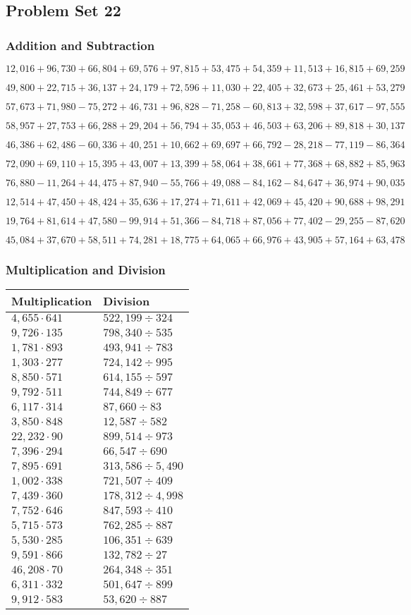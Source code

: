 \hypertarget{problem-set-22-4}{%
\subsection{Problem Set 22}\label{problem-set-22-4}}

\hypertarget{addition-and-subtraction-244}{%
\subsubsection{Addition and
Subtraction}\label{addition-and-subtraction-244}}

\(12,016+96,730+66,804+69,576+97,815+53,475+54,359+11,513+16,815+ 69,259\)

\(49,800+22,715+36,137+24,179+72,596+11,030+22,405+32,673+25,461+53,279\)

\(57,673+71,980-75,272+46,731+96,828-71,258-60,813+32,598+37,617-97,555\)

\(58,957+27,753+66,288+29,204+56,794+35,053+46,503+63,206+89,818+30,137\)

\(46,386+62,486-60,336+40,251+10,662+69,697+66,792-28,218-77,119-86,364\)

\(72,090+69,110+15,395+43,007+13,399+58,064+38,661+77,368+68,882+85,963\)

\(76,880-11,264+44,475+87,940-55,766+49,088-84,162-84,647+36,974+90,035\)

\(12,514+47,450+48,424+35,636+17,274+71,611+42,069+45,420+90,688+98,291\)

\(19,764+81,614+47,580-99,914+51,366-84,718+87,056+77,402-29,255-87,620\)

\(45,084+37,670+58,511+74,281+18,775+64,065+66,976+43,905+57,164+63,478\)

\hypertarget{multiplication-and-division-243}{%
\subsubsection{Multiplication and
Division}\label{multiplication-and-division-243}}

\begin{longtable}[]{@{}ll@{}}
\toprule
Multiplication & Division\tabularnewline
\midrule
\endhead
\(4,655\cdot641\) & \(522,199÷324\)\tabularnewline
\(9,726\cdot135\) & \(798,340÷535\)\tabularnewline
\(1,781\cdot893\) & \(493,941÷783\)\tabularnewline
\(1,303\cdot277\) & \(724,142÷995\)\tabularnewline
\(8,850\cdot571\) & \(614,155÷597\)\tabularnewline
\(9,792\cdot511\) & \(744,849÷677\)\tabularnewline
\(6,117\cdot314\) & \(87,660÷83\)\tabularnewline
\(3,850\cdot848\) & \(12,587÷582\)\tabularnewline
\(22,232\cdot90\) & \(899,514÷973\)\tabularnewline
\(7,396\cdot294\) & \(66,547÷690\)\tabularnewline
\(7,895\cdot691\) & \(313,586÷5,490\)\tabularnewline
\(1,002\cdot338\) & \(721,507÷409\)\tabularnewline
\(7,439\cdot360\) & \(178,312÷4,998\)\tabularnewline
\(7,752\cdot646\) & \(847,593÷410\)\tabularnewline
\(5,715\cdot573\) & \(762,285÷887\)\tabularnewline
\(5,530\cdot285\) & \(106,351÷639\)\tabularnewline
\(9,591\cdot866\) & \(132,782÷27\)\tabularnewline
\(46,208\cdot70\) & \(264,348÷351\)\tabularnewline
\(6,311\cdot332\) & \(501,647÷899\)\tabularnewline
\(9,912\cdot583\) & \(53,620÷887\)\tabularnewline
\bottomrule
\end{longtable}


